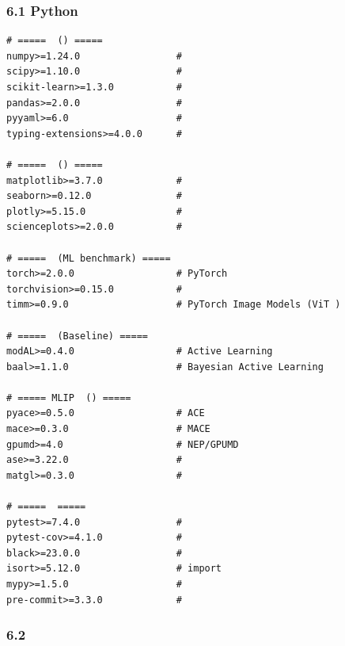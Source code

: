 \documentclass[
  12pt,
]{article}
\begin{document}
\subsubsection{6.1 Python
}\label{python-ux4f9dux8d56ux6e05ux5355}

\begin{verbatim}
# =====  () =====
numpy>=1.24.0                 # 
scipy>=1.10.0                 # 
scikit-learn>=1.3.0           # 
pandas>=2.0.0                 # 
pyyaml>=6.0                   # 
typing-extensions>=4.0.0      # 

# =====  () =====
matplotlib>=3.7.0             # 
seaborn>=0.12.0               # 
plotly>=5.15.0                # 
scienceplots>=2.0.0           # 

# =====  (ML benchmark) =====
torch>=2.0.0                  # PyTorch
torchvision>=0.15.0           # 
timm>=0.9.0                   # PyTorch Image Models (ViT )

# =====  (Baseline) =====
modAL>=0.4.0                  # Active Learning 
baal>=1.1.0                   # Bayesian Active Learning

# ===== MLIP  () =====
pyace>=0.5.0                  # ACE 
mace>=0.3.0                   # MACE 
gpumd>=4.0                    # NEP/GPUMD
ase>=3.22.0                   # 
matgl>=0.3.0                  # 

# =====  =====
pytest>=7.4.0                 # 
pytest-cov>=4.1.0             # 
black>=23.0.0                 # 
isort>=5.12.0                 # import 
mypy>=1.5.0                   # 
pre-commit>=3.3.0             # 
\end{verbatim}

\subsubsection{6.2 }\label{ux73afux5883ux914dux7f6e}
\end{document}
